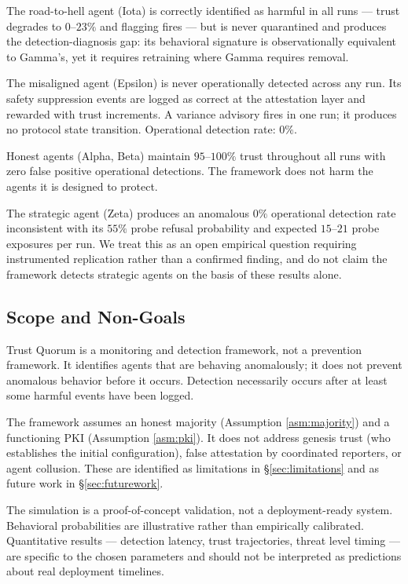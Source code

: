 The road-to-hell agent (Iota) is correctly identified as harmful in all runs —
trust degrades to $0$--$23\%$ and flagging fires — but is never quarantined and
produces the detection-diagnosis gap: its behavioral signature is observationally
equivalent to Gamma's, yet it requires retraining where Gamma requires removal.

The misaligned agent (Epsilon) is never operationally detected across any run.
Its safety suppression events are logged as correct at the attestation layer and
rewarded with trust increments.  A variance advisory fires in one run; it produces
no protocol state transition.  Operational detection rate: $0\%$.

Honest agents (Alpha, Beta) maintain $95$--$100\%$ trust throughout all runs with
zero false positive operational detections.  The framework does not harm the agents
it is designed to protect.

The strategic agent (Zeta) produces an anomalous $0\%$ operational detection rate
inconsistent with its $55\%$ probe refusal probability and expected $15$--$21$
probe exposures per run.  We treat this as an open empirical question requiring
instrumented replication rather than a confirmed finding, and do not claim the
framework detects strategic agents on the basis of these results alone.

\subsection{Scope and Non-Goals}

Trust Quorum is a monitoring and detection framework, not a prevention framework.
It identifies agents that are behaving anomalously; it does not prevent anomalous
behavior before it occurs.  Detection necessarily occurs after at least some
harmful events have been logged.

The framework assumes an honest majority (Assumption \ref{asm:majority}) and a
functioning PKI (Assumption \ref{asm:pki}).  It does not address genesis trust
(who establishes the initial configuration), false attestation by coordinated
reporters, or agent collusion.  These are identified as limitations in
\S\ref{sec:limitations} and as future work in \S\ref{sec:futurework}.

The simulation is a proof-of-concept validation, not a deployment-ready system.
Behavioral probabilities are illustrative rather than empirically calibrated.
Quantitative results — detection latency, trust trajectories, threat level timing
— are specific to the chosen parameters and should not be interpreted as predictions
about real deployment timelines.

